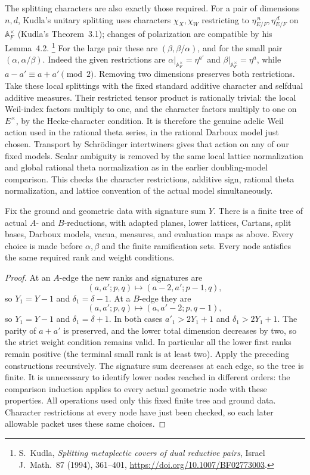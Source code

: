 The splitting characters are also exactly those required.
For a pair of dimensions \(n,d\), Kudla's unitary splitting
uses characters \(\chi_X,\chi_W\) restricting to
\(\eta_{E/F}^{\,n},\eta_{E/F}^{\,d}\) on \(\mathbb A_F^\times\)
(Kudla's Theorem~3.1); changes of polarization are compatible
by his Lemma~4.2.
\footnote{S.~Kudla, \emph{Splitting metaplectic covers of dual
reductive pairs}, Israel J.~Math.~87 (1994), 361--401,
\url{https://doi.org/10.1007/BF02773003}.}
For the large pair these are
\((\beta,\beta/\alpha)\), and for the small pair
\((\alpha,\alpha/\beta)\).
Indeed the given restrictions are
\(\alpha|_{\mathbb A_F^\times}=\eta^{a'}\) and
\(\beta|_{\mathbb A_F^\times}=\eta^a\), while
\(a-a'\equiv a+a'\pmod2\).
Removing two dimensions preserves both restrictions.
Take these local splittings with the fixed standard additive
character and selfdual additive measures. Their restricted
tensor product is rationally trivial: the local Weil-index
factors multiply to one, and the character factors multiply
to one on \(E^\times\), by the Hecke-character condition.
It is therefore the genuine adelic Weil action used in the
rational theta series, in the rational Darboux model just chosen.
Transport by Schr\"odinger intertwiners gives that action on
any of our fixed models. Scalar ambiguity is removed by the
same local lattice normalization and global rational theta
normalization as in the earlier doubling-model comparison.
This checks the character restrictions, additive sign,
rational theta normalization, and lattice convention of the
actual model simultaneously.

\begin{srproposition}
\label{prop:sr-theta-coherent-tower}
Fix the ground and geometric data with signature sum \(Y\).
There is a finite tree of actual \(A\)- and \(B\)-reductions,
with adapted planes, lower lattices, Cartans, split bases,
Darboux models, vacua, measures, and evaluation maps as above.
Every choice is made before \(\alpha,\beta\) and the finite
ramification sets. Every node satisfies the same required
rank and weight conditions.
\end{srproposition}

\begin{proof}
At an \(A\)-edge the new ranks and signatures are
\[
 (a,a';p,q)\longmapsto(a-2,a';p-1,q),
\]
so \(Y_1=Y-1\) and \(\delta_1=\delta-1\).
At a \(B\)-edge they are
\[
 (a,a';p,q)\longmapsto(a,a'-2;p,q-1),
\]
so \(Y_1=Y-1\) and \(\delta_1=\delta+1\).
In both cases \(a'_1>2Y_1+1\) and
\(\delta_1>2Y_1+1\). The parity of \(a+a'\)
is preserved, and the lower total dimension decreases by two,
so the strict weight condition remains valid.
In particular all the lower first ranks remain positive
(the terminal small rank is at least two).
Apply the preceding constructions recursively. The signature
sum decreases at each edge, so the tree is finite.
It is unnecessary to identify lower nodes reached in different
orders: the comparison induction applies to every actual
geometric node with these properties.
All operations used only this fixed finite tree and ground
data. Character restrictions at every node have just been
checked, so each later allowable packet uses these same choices.
\end{proof}
